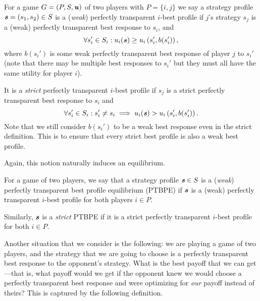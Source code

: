 \begin{definition}
	For a game $G = (P, S, \boldsymbol{\mathit{u}})$ of two players with $P = \{i, j\}$
	we say a strategy profile $\boldsymbol{\mathit{s}} = (s_1, s_2) \in S$ is a (\textit{weak}) perfectly transparent $i$-best profile if
	$j$'s strategy $s_j$ is a (weak) perfectly transparent best response to $s_i$, and
	\[
		\forall s_i' \in S_i: u_i(\boldsymbol{\mathit{s}}) \ge u_i\left(s_i', b(s_i')\right),
	\]
	where $b(s_i')$ is some weak perfectly transparent best response of player $j$ to $s_i'$ (note that there may be multiple best responses to $s_i'$ but they must all have the same utility for player $i$).

	It is a \textit{strict} perfectly transparent $i$-best profile if $s_j$ is a strict perfectly transparent best response to $s_i$ and
	\[
		\forall s_i' \in S_i: s_i' \ne s_i \implies u_i(\boldsymbol{\mathit{s}}) > u_i\left(s_i', b(s_i')\right).
	\]
	Note that we still consider $b(s_i')$ to be a weak best response even in the strict definition.
	This is to ensure that every strict best profile is also a weak best profile.
\end{definition}

Again, this notion naturally induces an equilibrium.

\begin{definition}
	For a game of two players, we say that a strategy profile $\boldsymbol{\mathit{s}} \in S$ is a (\textit{weak}) perfectly transparent best profile equilibrium (PTBPE) if $\boldsymbol{\mathit{s}}$ is a (weak) perfectly transparent $i$-best profile for both players $i \in P$.

	Similarly, $\boldsymbol{\mathit{s}}$ is a \textit{strict} PTBPE if it is a strict perfectly transparent $i$-best profile for both $i \in P$.
\end{definition}

Another situation that we consider is the following: we are playing a game of two players, and the strategy that we are going to choose is a perfectly transparent best response to the opponent's strategy.
What is the best payoff that we can get---that is, what payoff would we get if the opponent knew we would choose a perfectly transparent best response and were optimizing for \textit{our} payoff instead of theirs?
This is captured by the following definition.


